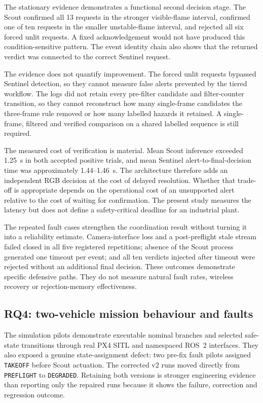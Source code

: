 The stationary evidence demonstrates a functional second decision stage. The
Scout confirmed all 13 requests in the stronger visible-flame interval,
confirmed one of ten requests in the smaller unstable-flame interval, and
rejected all six forced unlit requests. A fixed acknowledgement would not have
produced this condition-sensitive pattern. The event identity chain also shows
that the returned verdict was connected to the correct Sentinel request.

The evidence does not quantify improvement. The forced unlit requests bypassed
Sentinel detection, so they cannot measure false alerts prevented by the
tiered workflow. The logs did not retain every pre-filter candidate and filter-counter
transition, so they cannot reconstruct how many single-frame candidates the
three-frame rule removed or how many labelled hazards it retained. A
single-frame, filtered and verified comparison on a shared labelled sequence is
still required.

The measured cost of verification is material. Mean Scout inference exceeded
1.25~s in both accepted positive trials, and mean Sentinel
alert-to-final-decision time was approximately 1.44--1.46~s. The architecture
therefore adds an independent RGB decision at the cost of delayed resolution.
Whether that trade-off is appropriate depends on the operational cost of an
unsupported alert relative to the cost of waiting for confirmation. The
present study measures the latency but does not define a safety-critical
deadline for an industrial plant.

The repeated fault cases strengthen the coordination result without turning it
into a reliability estimate. Camera-interface loss and a post-preflight stale
stream failed closed in all five registered repetitions; absence of the Scout
process generated one timeout per event; and all ten verdicts injected after
timeout were rejected without an additional final decision. These outcomes
demonstrate specific defensive paths. They do not measure natural fault rates,
wireless recovery or rejection-memory effectiveness.

\subsection*{RQ4: two-vehicle mission behaviour and faults}

The simulation pilots demonstrate executable nominal branches and selected
safe-state transitions through real PX4 SITL and namespaced ROS~2 interfaces.
They also exposed a genuine state-assignment defect: two pre-fix fault pilots
assigned \texttt{TAKEOFF} before Scout actuation. The corrected v2 runs moved
directly from \texttt{PREFLIGHT} to \texttt{DEGRADED}. Retaining both versions
is stronger engineering evidence than reporting only the repaired runs because
it shows the failure, correction and regression outcome.

